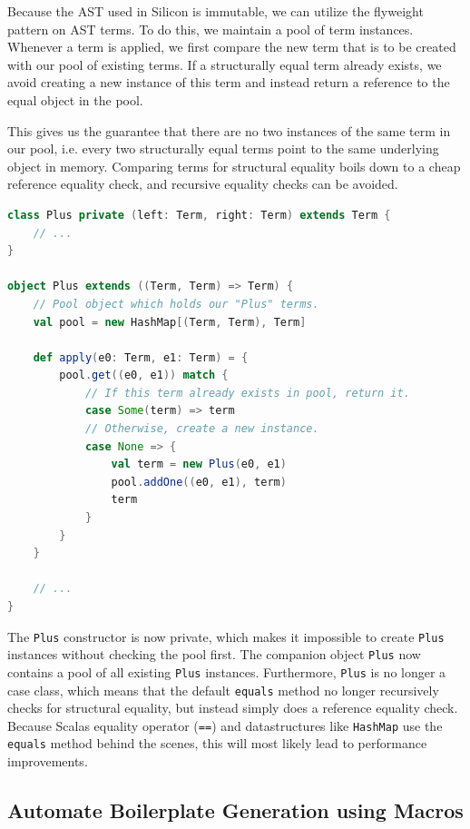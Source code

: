 \documentclass[11pt]{article}
\begin{document}
    Because the AST used in Silicon is immutable, we can utilize the flyweight pattern \cite{patterns} on AST terms.
    To do this, we maintain a pool of term instances. Whenever a term
    is applied, we first compare the new term that is to be created with our
    pool of existing terms. If a structurally equal term already exists, we
    avoid creating a new instance of this term and instead return a reference to the
    equal object in the pool.

    This gives us the guarantee that there are no two instances of the
    same term in our pool, i.e. every two structurally equal terms point to the same
    underlying object in memory. Comparing terms for structural equality boils
    down to a cheap reference equality check, and recursive equality checks can be avoided.
    
    \begin{lstlisting}[language=Scala, caption=Avoid instantiating multiple structurally equal terms using the flyweight pattern.]
class Plus private (left: Term, right: Term) extends Term {
    // ...
}

object Plus extends ((Term, Term) => Term) {
    // Pool object which holds our "Plus" terms.
    val pool = new HashMap[(Term, Term), Term]

    def apply(e0: Term, e1: Term) = {
        pool.get((e0, e1)) match {
            // If this term already exists in pool, return it. 
            case Some(term) => term
            // Otherwise, create a new instance.
            case None => {
                val term = new Plus(e0, e1)
                pool.addOne((e0, e1), term)
                term
            }
        }
    }

    // ...
}
    \end{lstlisting}

    The \texttt{Plus} constructor is now private, which makes it impossible to
    create \texttt{Plus} instances without checking the pool first. The companion
    object \texttt{Plus} now contains a pool of all existing \texttt{Plus} instances. Furthermore,
    \texttt{Plus} is no longer a case class, which means that the default \texttt{equals}
    method no longer recursively checks for structural equality, but instead
    simply does a reference equality check. Because Scalas equality operator (\texttt{==})
    and datastructures like \texttt{HashMap} use the \texttt{equals} method behind
    the scenes, this will most likely lead to performance improvements.

    \subsection{Automate Boilerplate Generation using Macros} \label{approach:macros}
\end{document}
